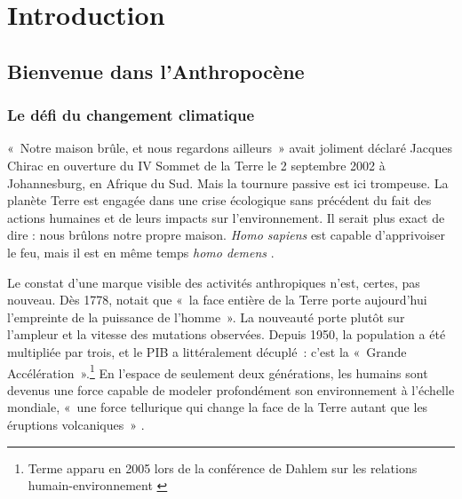 \chapter{Introduction}

\section{Bienvenue dans l’Anthropocène}

\subsection{Le défi du changement climatique}
«~Notre maison brûle, et nous regardons ailleurs » avait joliment déclaré Jacques Chirac en ouverture du IV Sommet de la Terre le 2 septembre 2002 à Johannesburg, en Afrique du Sud. Mais la tournure passive est ici trompeuse. La planète Terre est engagée dans une crise écologique sans précédent du fait des actions humaines et de leurs impacts sur l'environnement. Il serait plus exact de dire : nous brûlons notre propre maison. \textit{Homo sapiens} est capable d’apprivoiser le feu, mais il est en même temps \textit{homo demens} \citep{Morin1999}.

Le constat d'une marque visible des activités anthropiques n'est, certes, pas nouveau. Dès 1778, \citeauthor{Buffon1778} notait que «~la face entière de la Terre porte aujourd'hui l'empreinte de la puissance de l'homme~». La nouveauté porte plutôt sur l'ampleur et la vitesse des mutations observées. Depuis 1950, la population a été multipliée par trois, et le PIB a littéralement décuplé : c’est la «~Grande Accélération~».\footnote{Terme apparu en 2005 lors de la conférence de Dahlem sur les relations humain-environnement \citep{costanza2006}}
En l'espace de seulement deux générations, les humains sont devenus une force capable de modeler profondément son environnement à l'échelle mondiale, «~une force tellurique qui change la face de la Terre autant que les éruptions volcaniques~» \citep{Fressoz2013}. 

